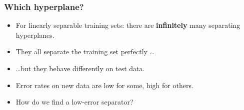 \documentclass[compress]{beamer}
\newcommand{\onedoc}{d}
\newcommand{\twasx}{t}
\newcommand{\1}{\mathbf{1}}
\begin{document}
\begin{frame}
\frametitle{Which hyperplane?}

\begin{itemize}

\item For linearly separable training sets: there are
  {\bf infinitely} many separating hyperplanes.

\item They all separate the training set perfectly \ldots

\item \ldots but they behave differently on test data.

\item Error rates on new data are low for some, high for
  others.

\item How do we find a low-error separator?



\end{itemize}

\end{frame}

%
%
%
\end{document}
